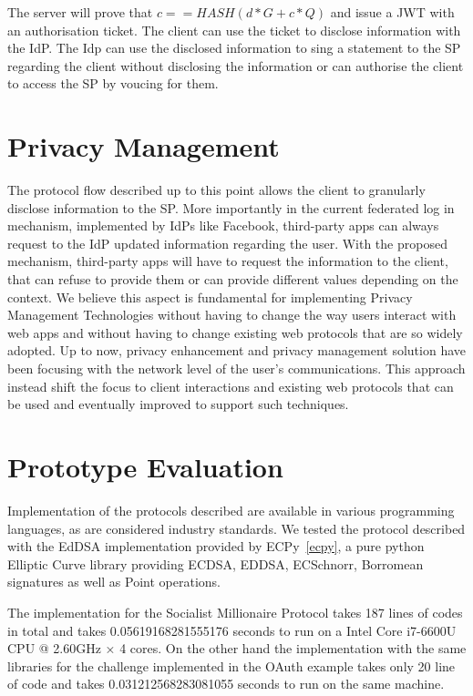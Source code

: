 The server will prove that $c == HASH(d * G + c * Q)$ and issue a JWT with an authorisation ticket.
The client can use the ticket to disclose information with the IdP. The Idp can use the disclosed information to sing a statement to the SP regarding the client without disclosing the information or can authorise the client to access the SP by voucing for them.

\section{Privacy Management}

The protocol flow described up to this point allows the client to granularly disclose information to the SP. More importantly in the current federated log in mechanism, implemented by IdPs like Facebook, third-party apps can always request to the IdP updated information regarding the user. With the proposed mechanism, third-party apps will have to request the information to the client, that can refuse to provide them or can provide different values depending on the context. 
We believe this aspect is fundamental for implementing Privacy Management Technologies without having to change the way users interact with web apps and without having to change existing web protocols that are so widely adopted. Up to now, privacy enhancement and privacy management solution have been focusing with the network level of the user's communications. This approach instead shift the focus to client interactions and existing web protocols that can be used and eventually improved to support such techniques.

\section{Prototype Evaluation}

Implementation of the protocols described are available in various programming languages, as are considered industry standards. We tested the protocol described with the EdDSA implementation provided by ECPy~\ref{ecpy}, a pure python Elliptic Curve library providing ECDSA, EDDSA, ECSchnorr, Borromean signatures as well as Point operations.

The implementation for the Socialist Millionaire Protocol takes 187 lines of codes in total and takes 0.05619168281555176 seconds to run on a Intel Core i7-6600U CPU @ 2.60GHz × 4 cores. On the other hand the implementation with the same libraries for the challenge implemented in the OAuth example takes only 20 line of code and takes 0.031212568283081055 seconds to run on the same machine.

